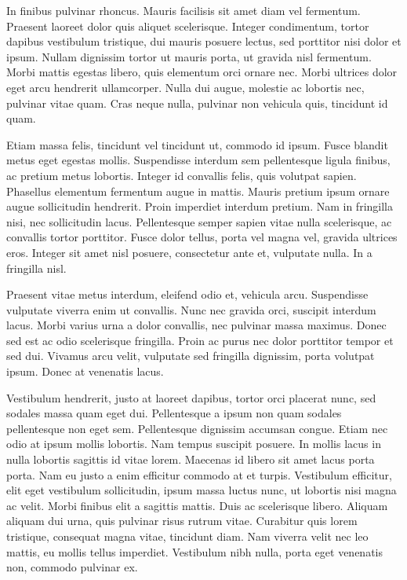 In finibus pulvinar rhoncus. Mauris facilisis sit amet diam vel fermentum. Praesent laoreet dolor quis aliquet scelerisque. Integer condimentum, tortor dapibus vestibulum tristique, dui mauris posuere lectus, sed porttitor nisi dolor et ipsum. Nullam dignissim tortor ut mauris porta, ut gravida nisl fermentum. Morbi mattis egestas libero, quis elementum orci ornare nec. Morbi ultrices dolor eget arcu hendrerit ullamcorper. Nulla dui augue, molestie ac lobortis nec, pulvinar vitae quam. Cras neque nulla, pulvinar non vehicula quis, tincidunt id quam.

Etiam massa felis, tincidunt vel tincidunt ut, commodo id ipsum. Fusce blandit metus eget egestas mollis. Suspendisse interdum sem pellentesque ligula finibus, ac pretium metus lobortis. Integer id convallis felis, quis volutpat sapien. Phasellus elementum fermentum augue in mattis. Mauris pretium ipsum ornare augue sollicitudin hendrerit. Proin imperdiet interdum pretium. Nam in fringilla nisi, nec sollicitudin lacus. Pellentesque semper sapien vitae nulla scelerisque, ac convallis tortor porttitor. Fusce dolor tellus, porta vel magna vel, gravida ultrices eros. Integer sit amet nisl posuere, consectetur ante et, vulputate nulla. In a fringilla nisl.

Praesent vitae metus interdum, eleifend odio et, vehicula arcu. Suspendisse vulputate viverra enim ut convallis. Nunc nec gravida orci, suscipit interdum lacus. Morbi varius urna a dolor convallis, nec pulvinar massa maximus. Donec sed est ac odio scelerisque fringilla. Proin ac purus nec dolor porttitor tempor et sed dui. Vivamus arcu velit, vulputate sed fringilla dignissim, porta volutpat ipsum. Donec at venenatis lacus.

Vestibulum hendrerit, justo at laoreet dapibus, tortor orci placerat nunc, sed sodales massa quam eget dui. Pellentesque a ipsum non quam sodales pellentesque non eget sem. Pellentesque dignissim accumsan congue. Etiam nec odio at ipsum mollis lobortis. Nam tempus suscipit posuere. In mollis lacus in nulla lobortis sagittis id vitae lorem. Maecenas id libero sit amet lacus porta porta. Nam eu justo a enim efficitur commodo at et turpis. Vestibulum efficitur, elit eget vestibulum sollicitudin, ipsum massa luctus nunc, ut lobortis nisi magna ac velit. Morbi finibus elit a sagittis mattis. Duis ac scelerisque libero. Aliquam aliquam dui urna, quis pulvinar risus rutrum vitae. Curabitur quis lorem tristique, consequat magna vitae, tincidunt diam. Nam viverra velit nec leo mattis, eu mollis tellus imperdiet. Vestibulum nibh nulla, porta eget venenatis non, commodo pulvinar ex.

